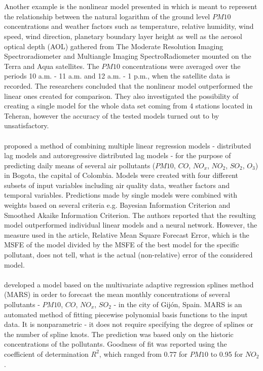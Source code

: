 \\\\
Another example is the nonlinear model presented in \cite{Sotoudeheian2014} which is meant to represent the relationship between the natural logarithm of the ground level $PM10$ concentrations and weather factors such as temperature, relative humidity, wind speed, wind direction, planetary boundary layer height as well as the aerosol optical depth (AOL) gathered from The Moderate Resolution Imaging Spectroradiometer and Multiangle Imaging SpectroRadiometer mounted on the Terra and Aqua satellites. The $PM10$ concentrations were averaged over the periods 10 a.m. - 11 a.m. and 12 a.m. - 1 p.m., when the satellite data is recorded. The researchers concluded that the nonlinear model outperformed the linear ones created for comparison. They also investigated the possibility of creating a single model for the whole data set coming from 4 stations located in Teheran, however the accuracy of the tested models turned out to by unsatisfactory.
\\\\
\cite{WESTERLUND201422} proposed a method of combining multiple linear regression models - distributed lag models and autoregressive distributed lag models - for the purpose of predicting daily means of several air pollutants ($PM10$, $CO$, $NO_x$, $NO_2$, $SO_2$, $O_3$) in Bogota, the capital of Colombia. Models were created with four different subsets of input variables including air quality data, weather factors and temporal variables. Predictions made by single models were combined with weights based on several criteria e.g. Bayesian Information Criterion and Smoothed Akaike Information Criterion. The authors reported that the resulting model outperformed individual linear models and a neural network. However, the measure used in the article, Relative Mean Square Forecast Error, which is the MSFE of the model divided by the MSFE of the best model for the specific pollutant, does not tell, what is the actual (non-relative) error of the considered model.
\\\\
\cite{GARCIANIETO201450} developed a model based on the multivariate adaptive regression splines  method (MARS) in order to forecast the mean monthly concentrations of several pollutants - $PM10$, $CO$, $NO_x$, $SO_2$ - in the city of Gijón, Spain. MARS is an automated method of fitting piecewise polynomial basis functions to the input data. It is nonparametric - it does not require specifying the degree of splines or the number of spline knots. The prediction was based only on the historic concentrations of the pollutants. Goodness of fit was reported using the coefficient of determination $R^2$, which ranged from 0.77 for $PM10$ to 0.95 for $NO_2$. 


